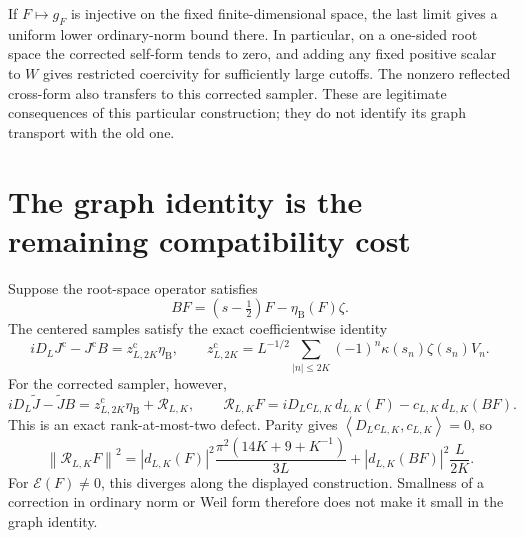 \documentclass[11pt]{article}
\theoremstyle{remark}
\newcommand{\norm}[1]{\left\lVert #1\right\rVert}
\newcommand{\ip}[2]{\left\langle #1,#2\right\rangle}
\newcommand{\Jc}{J^{\mathrm c}}
\newcommand{\Jr}{\widetilde J}
\newcommand{\E}{\mathscr E}
\begin{document}
If $F\mapsto g_F$ is injective on the fixed finite-dimensional space, the
last limit gives a uniform lower ordinary-norm bound there. In particular,
on a one-sided root space the corrected self-form tends to zero, and adding
any fixed positive scalar to $W$ gives restricted coercivity for sufficiently
large cutoffs. The nonzero reflected cross-form also transfers to this
corrected sampler. These are legitimate consequences of this particular
construction; they do not identify its graph transport with the old one.

\section{The graph identity is the remaining compatibility cost}

Suppose the root-space operator satisfies
\[
 BF=(s-\tfrac12)F-\eta_{\mathrm B}(F)\zeta.
\]
The centered samples satisfy the exact coefficientwise identity
\begin{equation}\label{v1:eq:centergraph}
 iD_L\Jc-\Jc B=z^{\mathrm c}_{L,2K}\eta_{\mathrm B},\qquad
 z^{\mathrm c}_{L,2K}=L^{-1/2}\sum_{|n|\le2K}
        (-1)^n\kappa(s_n)\zeta(s_n)V_n.
\end{equation}
For the corrected sampler, however,
\begin{equation}\label{v1:eq:graphdefect}
 iD_L\Jr-\Jr B=z^{\mathrm c}_{L,2K}\eta_{\mathrm B}+\mathcal R_{L,K},
 \qquad
 \mathcal R_{L,K}F=iD_Lc_{L,K}\,d_{L,K}(F)
                         -c_{L,K}\,d_{L,K}(BF).
\end{equation}
This is an exact rank-at-most-two defect. Parity gives
$\ip{D_Lc_{L,K}}{c_{L,K}}=0$, so
\begin{equation}\label{v1:eq:graphnorm}
 \norm{\mathcal R_{L,K}F}^2
 =|d_{L,K}(F)|^2\frac{\pi^2(14K+9+K^{-1})}{3L}
       +|d_{L,K}(BF)|^2\frac L{2K}.
\end{equation}
For $\E(F)\ne0$, this diverges along the displayed construction.
Smallness of a correction in ordinary norm or Weil form therefore does
not make it small in the graph identity.
\end{document}
